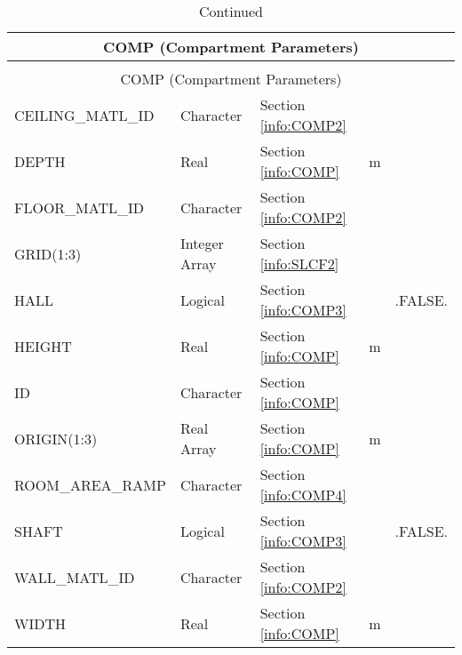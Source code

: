 \begin{longtable}{@{\extracolsep{\fill}}|l|l|l|l|l|}
\caption[Compartment parameters ({\ct COMP} namelist group)]{For more information see Section~\ref{info:COMP}.}
\label{tbl:COMP} \\
\hline
\multicolumn{5}{|c|}{{\ct COMP} (Compartment Parameters)} \\
\hline \hline
\endfirsthead
\caption[]{Continued} \\
\hline
\multicolumn{5}{|c|}{{\ct COMP} (Compartment Parameters)} \\
\hline \hline
\endhead
{\ct CEILING\_MATL\_ID}     & Character & Section \ref{info:COMP2}                 &           &                 \\ \hline
{\ct DEPTH}                 & Real      & Section \ref{info:COMP}                 & m         &  		\\ \hline
{\ct FLOOR\_MATL\_ID}       & Character & Section \ref{info:COMP2}                 &           &                 \\ \hline
{\ct GRID(1:3)}             & Integer Array   & Section \ref{info:SLCF2}                 &           &                 \\ \hline
{\ct HALL}                  & Logical   & Section \ref{info:COMP3}     &           & {\ct .FALSE.}   \\ \hline
{\ct HEIGHT}                & Real      & Section \ref{info:COMP}     & m         &                 \\ \hline
{\ct ID}                    & Character & Section \ref{info:COMP}     &           &                 \\ \hline
{\ct ORIGIN(1:3)}           & Real Array     & Section \ref{info:COMP}                 & m         &                 \\ \hline
{\ct ROOM\_AREA\_RAMP}      & Character & Section \ref{info:COMP4}                 &           &                 \\ \hline
{\ct SHAFT}                 & Logical   & Section \ref{info:COMP3}                 &           & {\ct .FALSE.}   \\ \hline
{\ct WALL\_MATL\_ID}        & Character & Section \ref{info:COMP2}                 &           &                 \\ \hline
{\ct WIDTH}                 & Real      & Section \ref{info:COMP}     & m         &                 \\ \hline
\end{longtable}


